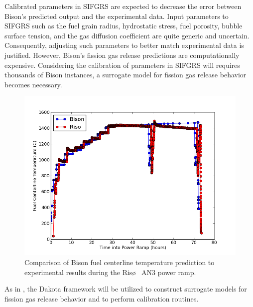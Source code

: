 Calibrated parameters in \ac{SIFGRS} are expected to decrease the error between Bison's predicted output and the experimental data. Input parameters to \ac{SIFGRS} such as the fuel grain radius, hydrostatic stress, fuel porosity, bubble surface tension, and the gas diffusion coefficient are quite generic and uncertain. Consequently, adjusting such parameters to better match experimental data is justified. However, Bison's fission gas release predictions are computationally expensive. Considering the calibration of parameters in \ac{SIFGRS} will requires thousands of Bison instances, a surrogate model for fission gas release behavior becomes necessary. 
\begin{figure}
\caption{\label{fig:riso_tc_temp}
Comparison of Bison fuel centerline temperature prediction to experimental results during the Ris\o~ AN3 power ramp.}
 \begin{center}
  \includegraphics[scale=.75]{./Chapter4/tc_temp_comparison.png}
 \end{center}
\end{figure} 
As in \cite{Swiler}, the Dakota framework will be utilized to construct surrogate models for fission gas release behavior and to perform calibration routines. 

